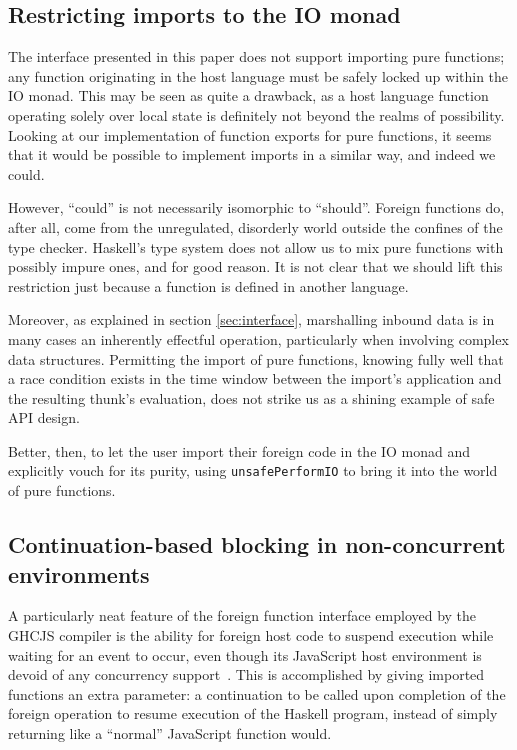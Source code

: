 \documentclass[preprint]{sigplanconf}
\begin{document}
\subsection{Restricting imports to the IO monad}
The interface presented in this paper does not support importing pure
functions; any function originating in the host language must be safely locked
up within the IO monad. This may be seen as quite a drawback, as a host
language function operating solely over local state is definitely not
beyond the realms of possibility. Looking at our implementation of function
exports for pure functions, it seems that it would be possible to implement
imports in a similar way, and indeed we could.

However, ``could'' is not necessarily isomorphic to ``should''.
Foreign functions do, after all, come from the unregulated, disorderly world
outside the confines of the type checker. Haskell's type system does not
allow us to mix pure functions with possibly impure ones, and for good
reason. It is not clear that we should lift this
restriction just because a function is defined in another language.

Moreover, as explained in section \ref{sec:interface}, marshalling inbound
data is in many cases an inherently effectful operation, particularly when
involving complex data structures. Permitting the import of pure functions,
knowing fully well that a race condition exists in the time window between
the import's application and the resulting thunk's evaluation, does not strike
us as a shining example of safe API design.

Better, then, to let the user import their foreign code in the IO monad and
explicitly vouch for its purity, using \lstinline!unsafePerformIO! to bring it
into the world of pure functions.

\subsection{Continuation-based blocking in non-concurrent environments}
A particularly neat feature of the foreign function interface employed by the
GHCJS compiler is the ability for foreign host code to suspend execution while
waiting for an event to occur, even though its JavaScript host environment is
devoid of any concurrency support\ \cite{ghcjs}.
This is accomplished by giving imported functions an extra parameter:
a continuation to be called upon completion
of the foreign operation to resume execution of the Haskell program, instead
of simply returning like a ``normal'' JavaScript function would.
\end{document}
